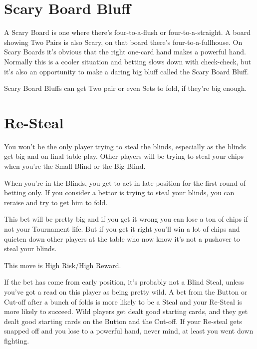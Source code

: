 \section{Scary Board Bluff}

A Scary Board is one where there's four-to-a-flush or four-to-a-straight.
A board showing Two Pairs is also Scary, on that board there's
four-to-a-fullhouse.  On Scary Boards it's obvious that the
right one-card hand makes a powerful hand. Normally this is a
cooler situation and betting slows down with check-check, but it's
also an opportunity to make a daring big bluff called the Scary Board Bluff.

Scary Board Bluffs can get Two pair or even Sets to fold, if they're
big enough.

\section{Re-Steal}

You won't be the only player trying to steal the blinds, especially
as the blinds get big and on final table play. Other players will
be trying to steal your chips when you're the Small Blind or the
Big Blind.

When you're in the Blinds, you get to act in late position for
the first round of betting only. If you consider a bettor is
trying to steal your blinds, you can reraise and try to
get him to fold.

This bet will be pretty big and if you get it wrong you can
lose a ton of chips if not your Tournament life. But if you get
it right you'll win a lot of chips and quieten down other
players at the table who now know it's not a pushover to steal
your blinds.

This move is High Risk/High Reward.

If the bet has come from early position, it's probably not a Blind Steal,
unless you've got a read on this player as being pretty wild. A bet
from the Button or Cut-off after a bunch of folds is more likely to
be a Steal and your Re-Steal is more likely to succeed. Wild players
get dealt good starting cards, and they get dealt good starting cards
on the Button and the Cut-off. If your Re-steal gets snapped off and
you lose to a powerful hand, never mind, at least you went down fighting.
